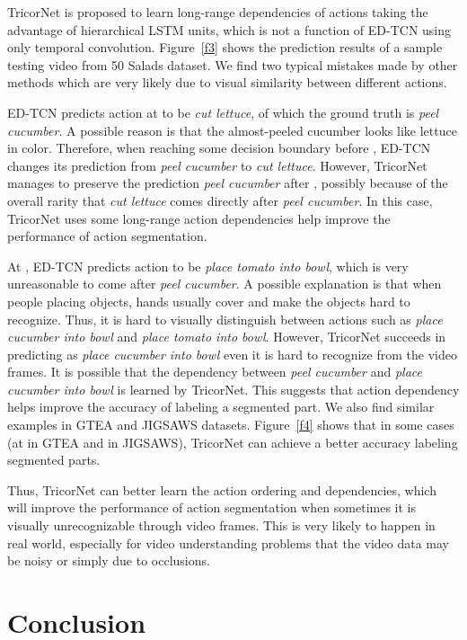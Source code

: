 \documentclass{article}
\begin{document}
TricorNet is proposed to learn long-range dependencies of actions taking the advantage of hierarchical LSTM units, which is not a function of ED-TCN using only temporal convolution. Figure~\ref{f3} shows the prediction results of a sample testing video from 50 Salads dataset. We find two typical mistakes made by other methods which are very likely due to visual similarity between different actions. 

ED-TCN predicts action at  to be \textit{cut lettuce}, of which the ground truth is \textit{peel cucumber}. A possible reason is that the almost-peeled cucumber looks like lettuce in color. Therefore, when reaching some decision boundary before , ED-TCN changes its prediction from \textit{peel cucumber} to \textit{cut lettuce}. However, TricorNet manages to preserve the prediction \textit{peel cucumber} after , possibly because of the overall rarity that \textit{cut lettuce} comes directly after \textit{peel cucumber}. In this case, TricorNet uses some long-range action dependencies help improve the performance of action segmentation.

At , ED-TCN predicts action to be \textit{place tomato into bowl}, which is very unreasonable to come after \textit{peel cucumber}. A possible explanation is that when people placing objects, hands usually cover and make the objects hard to recognize. Thus, it is hard to visually distinguish between actions such as \textit{place cucumber into bowl} and \textit{place tomato into bowl}. However, TricorNet succeeds in predicting  as  \textit{place cucumber into bowl} even it is hard to recognize from the video frames. It is possible that the dependency between \textit{peel cucumber} and \textit{place cucumber into bowl} is learned by TricorNet. This suggests that action dependency helps improve the accuracy of labeling a segmented part. We also find similar examples in GTEA and JIGSAWS datasets. Figure~\ref{f4} shows that in some cases (at  in GTEA and  in JIGSAWS), TricorNet can achieve a better accuracy labeling segmented parts. 

Thus, TricorNet can better learn the action ordering and dependencies, which will improve the performance of action segmentation when sometimes it is visually unrecognizable through video frames. This is very likely to happen in real world, especially for video understanding problems that the video data may be noisy or simply due to occlusions. 


\section{Conclusion}
\label{sec:con}
\end{document}
